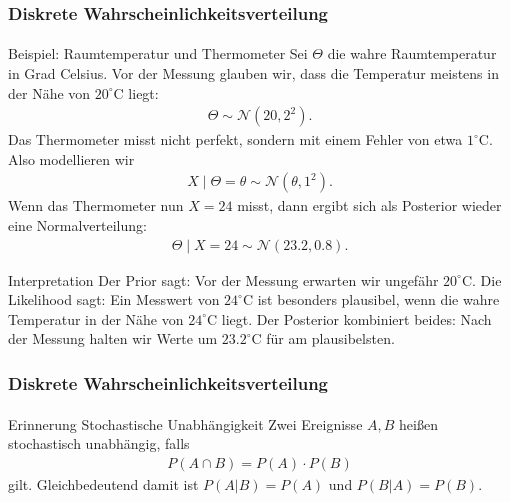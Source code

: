 \documentclass{beamer}
\begin{document}
\begin{frame}[shrink=5]
    \frametitle{Diskrete Wahrscheinlichkeitsverteilung}
\framesubtitle{}

\begin{block}{Beispiel: Raumtemperatur und Thermometer}
Sei $\Theta$ die wahre Raumtemperatur in Grad Celsius. Vor der Messung glauben wir, dass die Temperatur meistens in der Nähe von $20^\circ$C liegt:
\begin{align*}
\Theta \sim \mathcal N(20,2^2).
\end{align*}
Das Thermometer misst nicht perfekt, sondern mit einem Fehler von etwa $1^\circ$C. Also modellieren wir
\begin{align*}
X \mid \Theta=\theta \sim \mathcal N(\theta,1^2).
\end{align*}
Wenn das Thermometer nun $X=24$ misst, dann ergibt sich als Posterior wieder eine Normalverteilung:
\begin{align*}
\Theta \mid X=24 \sim \mathcal N(23.2,0.8).
\end{align*}
\end{block}

\begin{block}{Interpretation}
Der Prior sagt: Vor der Messung erwarten wir ungefähr $20^\circ$C.
Die Likelihood sagt: Ein Messwert von $24^\circ$C ist besonders plausibel, wenn die wahre Temperatur in der Nähe von $24^\circ$C liegt.
Der Posterior kombiniert beides: Nach der Messung halten wir Werte um $23.2^\circ$C für am plausibelsten.
\end{block}

 \end{frame}



\begin{frame}
    \frametitle{Diskrete Wahrscheinlichkeitsverteilung}
\framesubtitle{}

\begin{block}{Erinnerung Stochastische Unabhängigkeit}
Zwei Ereignisse $A,B$ heißen stochastisch unabhängig, falls
\begin{align*}
P(A \cap B) = P(A) \cdot P(B)
\end{align*}
gilt.  Gleichbedeutend damit ist  $P(A | B) = P(A)$ und $P(B  | A) = P(B)$.
\end{block}

 \end{frame}
\end{document}
